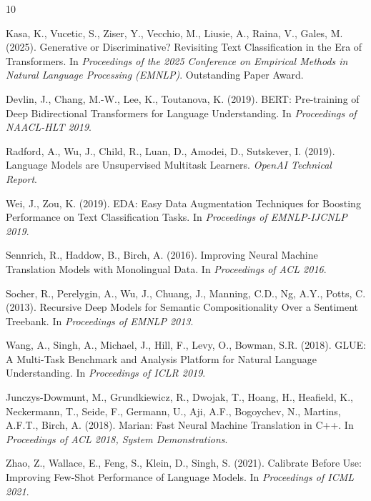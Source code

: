 \documentclass[11pt,a4paper]{article}
\begin{document}
\begin{thebibliography}{10}

Kasa, K., Vucetic, S., Ziser, Y., Vecchio, M., Liusie, A., Raina, V., Gales, M. (2025).
\newblock Generative or Discriminative? Revisiting Text Classification in the Era of Transformers.
\newblock In \emph{Proceedings of the 2025 Conference on Empirical Methods in Natural Language Processing (EMNLP)}.
\newblock Outstanding Paper Award.

Devlin, J., Chang, M.-W., Lee, K., Toutanova, K. (2019).
\newblock BERT: Pre-training of Deep Bidirectional Transformers for Language Understanding.
\newblock In \emph{Proceedings of NAACL-HLT 2019}.

Radford, A., Wu, J., Child, R., Luan, D., Amodei, D., Sutskever, I. (2019).
\newblock Language Models are Unsupervised Multitask Learners.
\newblock \emph{OpenAI Technical Report}.

Wei, J., Zou, K. (2019).
\newblock EDA: Easy Data Augmentation Techniques for Boosting Performance on Text Classification Tasks.
\newblock In \emph{Proceedings of EMNLP-IJCNLP 2019}.

Sennrich, R., Haddow, B., Birch, A. (2016).
\newblock Improving Neural Machine Translation Models with Monolingual Data.
\newblock In \emph{Proceedings of ACL 2016}.

Socher, R., Perelygin, A., Wu, J., Chuang, J., Manning, C.D., Ng, A.Y., Potts, C. (2013).
\newblock Recursive Deep Models for Semantic Compositionality Over a Sentiment Treebank.
\newblock In \emph{Proceedings of EMNLP 2013}.

Wang, A., Singh, A., Michael, J., Hill, F., Levy, O., Bowman, S.R. (2018).
\newblock GLUE: A Multi-Task Benchmark and Analysis Platform for Natural Language Understanding.
\newblock In \emph{Proceedings of ICLR 2019}.

Junczys-Dowmunt, M., Grundkiewicz, R., Dwojak, T., Hoang, H., Heafield, K., Neckermann, T., Seide, F., Germann, U., Aji, A.F., Bogoychev, N., Martins, A.F.T., Birch, A. (2018).
\newblock Marian: Fast Neural Machine Translation in {C++}.
\newblock In \emph{Proceedings of ACL 2018, System Demonstrations}.

Zhao, Z., Wallace, E., Feng, S., Klein, D., Singh, S. (2021).
\newblock Calibrate Before Use: Improving Few-Shot Performance of Language Models.
\newblock In \emph{Proceedings of ICML 2021}.


\end{thebibliography}
\end{document}
